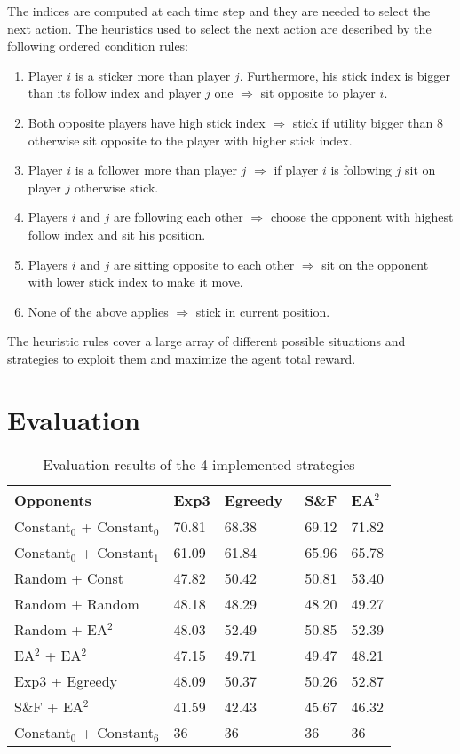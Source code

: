 \documentclass[runningheads]{llncs}
\begin{document}
The indices are computed at each time step and they are needed to
select the next action. The heuristics used to select the next action
are described by the following ordered condition rules:
\begin{enumerate}
\item Player $i$ is a sticker more than player $j$. Furthermore, his
  stick index is bigger than its follow index and player $j$
  one $\Rightarrow$ sit opposite to player $i$.
\item Both opposite players have high stick index $\Rightarrow$ stick
  if utility bigger than 8 otherwise sit opposite to the player with
  higher stick index.
\item Player $i$ is a follower more than player $j$ $\Rightarrow$
  if player $i$ is following $j$ sit on player $j$ otherwise stick.
\item Players $i$ and $j$ are following each other $\Rightarrow$
  choose the opponent with highest follow index and sit his position. 
\item Players $i$ and $j$ are sitting opposite to each other
  $\Rightarrow$ sit on the opponent with lower stick index to make it
  move.
\item None of the above applies $\Rightarrow$ stick in current position.
\end{enumerate}
The heuristic rules cover a large array of different possible
situations and strategies to exploit them and maximize the agent total
reward.

\section{Evaluation}

\begin{table}[h!]
\centering
\caption{Evaluation results of the 4 implemented strategies}
\label{tab:my-table}
\begin{tabular}{l|l|l|l|l}
Opponents       & Exp3 \; & Egreedy \, & S\&F \;\; & EA$^2$   \\
\hline
Constant$_0$ + Constant$_0$ \;& 70.81 & 68.38   & 69.12 & 71.82 \\
Constant$_0$ + Constant$_1$ & 61.09 & 61.84   & 65.96 & 65.78 \\
Random + Const    & 47.82 & 50.42   & 50.81 & 53.40 \\
Random + Random  \;   & 48.18 & 48.29   & 48.20 & 49.27 \\
Random + EA$^2$   & 48.03 & 52.49   & 50.85 & 52.39 \\
EA$^2$ + EA$^2$ & 47.15 & 49.71   & 49.47 & 48.21 \\
Exp3 + Egreedy  & 48.09 & 50.37   & 50.26 & 52.87 \\
S\&F + EA$^2$       & 41.59 & 42.43   & 45.67 & 46.32 \\
Constant$_0$ + Constant$_6$ & 36    & 36      & 36    & 36
\end{tabular}
\end{table}
\end{document}

